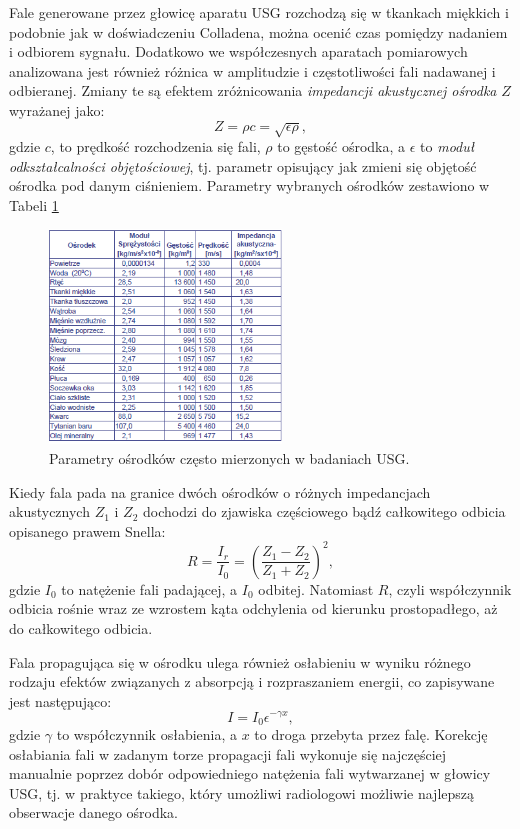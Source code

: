 Fale generowane przez głowicę aparatu USG rozchodzą się w tkankach miękkich i podobnie jak w doświadczeniu Colladena, można ocenić czas pomiędzy nadaniem i odbiorem sygnału. Dodatkowo we współczesnych aparatach pomiarowych analizowana jest również różnica w amplitudzie i częstotliwości fali nadawanej i odbieranej. Zmiany te są efektem zróżnicowania \textit{impedancji akustycznej ośrodka} $Z$ wyrażanej jako:
\begin{equation}
Z = \rho c = \sqrt{\epsilon \rho},
\end{equation}
gdzie $c$, to prędkość rozchodzenia się fali, $\rho$ to gęstość ośrodka, a $\epsilon$ to \textit{moduł odkształcalności objętościowej}, tj. parametr opisujący jak zmieni się objętość ośrodka pod danym ciśnieniem. Parametry wybranych ośrodków zestawiono w Tabeli \ref{USG-params} 
\begin{figure}[h!]
	\centering
	\includegraphics[width=0.55\textwidth]{figures/USG-params.png}
	\caption{Parametry ośrodków często mierzonych w badaniach USG.}
	\label{USG-params}
\end{figure}
Kiedy fala pada na granice dwóch ośrodków o różnych impedancjach akustycznych $Z_1$ i $Z_2$ dochodzi do zjawiska częściowego bądź całkowitego odbicia opisanego prawem Snella:
\begin{equation}
R = \frac{I_r}{I_0} = \left(\frac{Z_1-Z_2}{Z_1+Z_2}\right)^2,
\end{equation}
gdzie $I_0$ to natężenie fali padającej, a $I_0$ odbitej. Natomiast $R$, czyli współczynnik odbicia rośnie wraz ze wzrostem kąta odchylenia od kierunku prostopadłego, aż do całkowitego odbicia.

Fala propagująca się w ośrodku ulega również osłabieniu w wyniku różnego rodzaju efektów związanych z absorpcją i rozpraszaniem energii, co zapisywane jest następująco:
\begin{equation}
I=I_0 \epsilon^{-\gamma x},
\end{equation}
gdzie $\gamma$ to współczynnik osłabienia, a $x$ to droga przebyta przez falę. Korekcję osłabiania fali w zadanym torze propagacji fali wykonuje się najczęściej manualnie poprzez dobór odpowiedniego natężenia fali wytwarzanej w głowicy USG, tj. w praktyce takiego, który umożliwi radiologowi możliwie najlepszą obserwacje danego ośrodka. 

